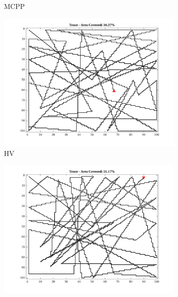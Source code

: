 \begin{figure}[htb!]
\begin{subfigure}[t]{0.25\textwidth}
        \captionsetup{skip=0.20\baselineskip,size=footnotesize}
        \caption{MCPP}
    \end{subfigure}%
    \begin{subfigure}[t]{0.25\textwidth}
        \centering
        \includegraphics[width=\linewidth]{figures/path_nhv_30p_100x100_sf_100_seed_2.png}
        \captionsetup{skip=0.20\baselineskip,size=footnotesize}
        \caption{HV}
    \end{subfigure}%
    \begin{subfigure}[t]{0.25\textwidth}
        \centering
        \includegraphics[width=\linewidth]{figures/path_nnhv_30p_100x100_sf_100_seed_2.png}
        \captionsetup{skip=0.20\baselineskip,size=footnotesize}

\end{subfigure}
\end{figure}
